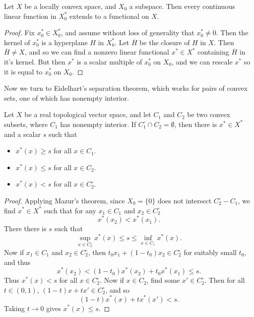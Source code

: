 \begin{corollary}
    Let $X$ be a locally convex space, and $X_0$ a subspace. Then every continuous linear function in $X_0^*$ extends to a functional on $X$.
\end{corollary}
\begin{proof}
    Fix $x_0^* \in X_0^*$, and assume without loss of generality that $x_0^* \neq 0$. Then the kernel of $x_0^*$ is a hyperplane $H$ in $X_0^*$. Let $\overline{H}$ be the closure of $H$ in $X$. Then $\overline{H} \neq X$, and so we can find a nonzero linear functional $x^* \in X^*$ containing $\overline{H}$ in it's kernel. But then $x^*$ is a scalar multiple of $x_0^*$ on $X_0$, and we can rescale $x^*$ so it is equal to $x_0^*$ on $X_0$.
\end{proof}

Now we turn to Eidelhart's separation theorem, which works for pairs of convex sets, one of which has nonempty interior.

\begin{theorem}
    Let $X$ be a real topological vector space, and let $C_1$ and $C_2$ be two convex subsets, where $C_1$ has nonempty interior. If $C_1^\circ \cap C_2 = \emptyset$, then there is $x^* \in X^*$ and a scalar $s$ such that
    \begin{itemize}
        \item $x^*(x) \geq s$ for all $x \in C_1$.
        \item $x^*(x) \leq s$ for all $x \in C_2$.
        \item $x^*(x) < s$ for all $x \in C_2^\circ$.
    \end{itemize}
\end{theorem}
\begin{proof}
    Applying Mazur's theorem, since $X_0 = \{ 0 \}$ does not intersect $C_2^\circ - C_1$, we find $x^* \in X^*$ such that for any $x_1 \in C_1$ and $x_2 \in C_2^\circ$
    \[ x^*(x_2) < x^*(x_1). \]
    There there is $s$ such that
    \[ \sup_{x \in C_2^\circ} x^*(x) \leq s \leq \inf_{x \in C_1} x^*(x). \]
    Now if $x_1 \in C_1$ and $x_2 \in C_2^\circ$, then $t_0 x_1 + (1 - t_0) x_2 \in C_2^\circ$ for suitably small $t_0$, and thus
    \[ x^*(x_2) < (1 - t_0) x^*(x_2) + t_0 x^*(x_1) \leq s. \]
    Thus $x^*(x) < s$ for all $x \in C_2^\circ$. Now if $x \in C_2$, find some $x' \in C_2^\circ$. Then for all $t \in (0,1)$, $(1 - t)x + tx' \in C_2^\circ$, and so
    \[ (1 - t) x^*(x) + t x^*(x') < s. \]
    Taking $t \to 0$ gives $x^*(x) \leq s$.
\end{proof}

